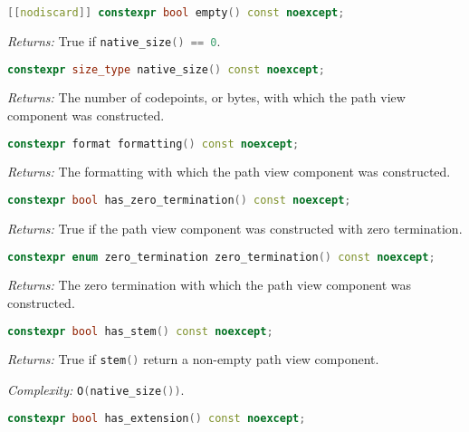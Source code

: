 \documentclass[11pt]{article}
\newcommand{\code}[2][cpp]{\lstinline[language=#1,basicstyle=\small\ttfamily]{#2}}
\newcommand{\desc}[1]{\textit{#1}}
\newcommand{\returns}{\desc{Returns: }}
\newcommand{\complexity}{\desc{Complexity: }}
\begin{document}
\begin{lstlisting}[language=cpp]
    [[nodiscard]] constexpr bool empty() const noexcept;
\end{lstlisting}

\returns True if \code{native_size() == 0}.\\

\begin{lstlisting}[language=cpp]
    constexpr size_type native_size() const noexcept;
\end{lstlisting}

\returns The number of codepoints, or bytes, with which the path view component was constructed.\\

\begin{lstlisting}[language=cpp]
    constexpr format formatting() const noexcept;
\end{lstlisting}

\returns The formatting with which the path view component was constructed.\\

\begin{lstlisting}[language=cpp]
    constexpr bool has_zero_termination() const noexcept;
\end{lstlisting}

\returns True if the path view component was constructed with zero termination.\\

\begin{lstlisting}[language=cpp]
    constexpr enum zero_termination zero_termination() const noexcept;
\end{lstlisting}

\returns The zero termination with which the path view component was constructed.\\

\begin{lstlisting}[language=cpp]
    constexpr bool has_stem() const noexcept;
\end{lstlisting}

\returns True if \code{stem()} return a non-empty path view component.

\complexity \code{O(native_size())}.\\

\begin{lstlisting}[language=cpp]
    constexpr bool has_extension() const noexcept;
\end{lstlisting}
\end{document}
